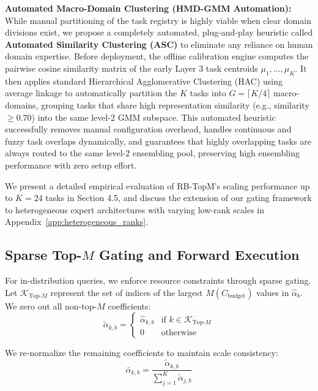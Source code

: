 \textbf{Automated Macro-Domain Clustering (HMD-GMM Automation):} While manual partitioning of the task registry is highly viable when clear domain divisions exist, we propose a completely automated, plug-and-play heuristic called \textbf{Automated Similarity Clustering (ASC)} to eliminate any reliance on human domain expertise. Before deployment, the offline calibration engine computes the pairwise cosine similarity matrix of the early Layer 3 task centroids $\mu_1, \dots, \mu_K$. It then applies standard Hierarchical Agglomerative Clustering (HAC) using average linkage to automatically partition the $K$ tasks into $G = \lceil K / 4 \rceil$ macro-domains, grouping tasks that share high representation similarity (e.g., similarity $\ge 0.70$) into the same level-2 GMM subspace. This automated heuristic successfully removes manual configuration overhead, handles continuous and fuzzy task overlaps dynamically, and guarantees that highly overlapping tasks are always routed to the same level-2 ensembling pool, preserving high ensembling performance with zero setup effort.

We present a detailed empirical evaluation of RB-TopM's scaling performance up to $K=24$ tasks in Section 4.5, and discuss the extension of our gating framework to heterogeneous expert architectures with varying low-rank scales in Appendix~\ref{app:heterogeneous_ranks}.

\subsection{Sparse Top-$M$ Gating and Forward Execution}
For in-distribution queries, we enforce resource constraints through sparse gating. Let $\mathcal{K}_{\text{Top-}M}$ represent the set of indices of the largest $M(C_{\text{budget}})$ values in $\hat{\alpha}_b$. We zero out all non-top-$M$ coefficients:
\begin{equation}
\tilde{\alpha}_{k, b} = \begin{cases} \hat{\alpha}_{k, b} & \text{if } k \in \mathcal{K}_{\text{Top-}M} \\ 0 & \text{otherwise} \end{cases}
\label{eq:topm_mask}
\end{equation}

We re-normalize the remaining coefficients to maintain scale consistency:
\begin{equation}
\bar{\alpha}_{k, b} = \frac{\tilde{\alpha}_{k, b}}{\sum_{j=1}^K \tilde{\alpha}_{j, b}}
\label{eq:renorm}
\end{equation}

